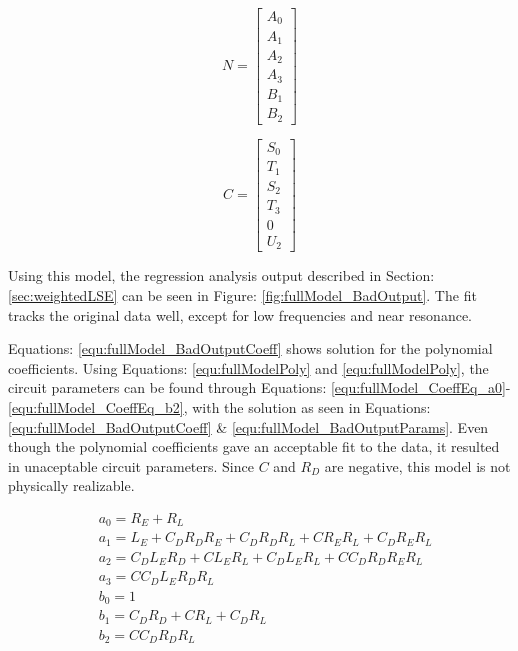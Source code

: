\begin{multicols}{2}
\begin{equation}
\label{equ:fullModel_N}
N = 
\begin{bmatrix}
A_0 \\
A_1 \\
A_2 \\
A_3 \\
B_1 \\
B_2
\end{bmatrix}
\end{equation}

\begin{equation}
\label{equ:fullModel_C}
C = 
\begin{bmatrix}
S_0 \\
T_1 \\
S_2 \\
T_3 \\
0   \\
U_2
\end{bmatrix}
\end{equation}
\end{multicols}

Using this model, the regression analysis output described in Section: \ref{sec:weightedLSE} can be seen in Figure: \ref{fig:fullModel_BadOutput}. The fit tracks the original data well, except for low frequencies and near resonance. 



Equations: \eqref{equ:fullModel_BadOutputCoeff} shows solution for the polynomial coefficients. Using Equations: \eqref{equ:fullModelPoly} and \eqref{equ:fullModelPoly}, the circuit parameters can be found through Equations: \eqref{equ:fullModel_CoeffEq_a0}-\eqref{equ:fullModel_CoeffEq_b2}, with the solution as seen in Equations: \eqref{equ:fullModel_BadOutputCoeff} \& \eqref{equ:fullModel_BadOutputParams}.
Even though the polynomial coefficients gave an acceptable fit to the data, it resulted in unaceptable circuit parameters. Since $C$ and $R_D$ are negative, this model is not physically realizable.

\begin{align}
&a_0 = R_E + R_L                                         \label{equ:fullModel_CoeffEq_a0} \\
&a_1 = L_E + C_DR_DR_E + C_DR_DR_L + CR_ER_L + C_DR_ER_L \label{equ:fullModel_CoeffEq_a1} \\
&a_2 = C_DL_ER_D + CL_ER_L + C_DL_ER_L + CC_DR_DR_ER_L   \label{equ:fullModel_CoeffEq_a2} \\
&a_3 = CC_DL_ER_DR_L                                     \label{equ:fullModel_CoeffEq_a3} \\
&b_0 = 1                                                 \label{equ:fullModel_CoeffEq_b0} \\
&b_1 = C_DR_D + CR_L + C_DR_L                            \label{equ:fullModel_CoeffEq_b1} \\
&b_2 = CC_DR_DR_L                                        \label{equ:fullModel_CoeffEq_b2}
\end{align}

